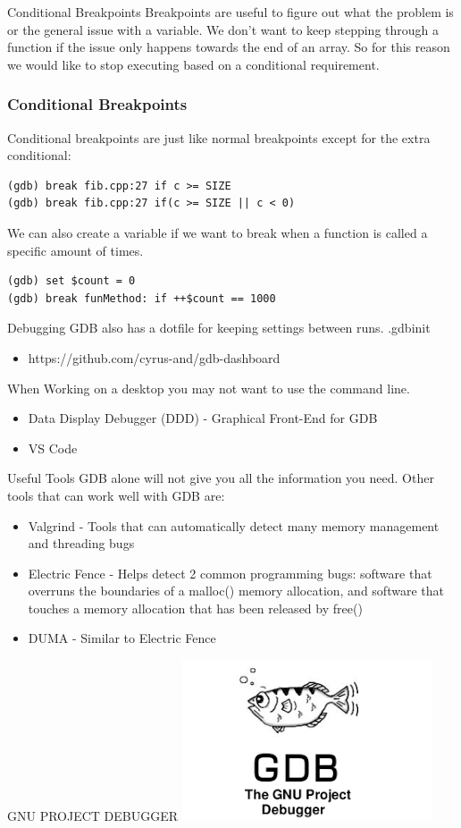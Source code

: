 \documentclass[11pt]{beamer}
\begin{document}
\begin{frame}{Conditional Breakpoints}
        Breakpoints are useful to figure out what the problem is or the general issue with a variable. 
        \break
        \break
        We don't want to keep stepping through a function if the issue only happens towards the end of an array. 
        \break
        \break
        So for this reason we would like to stop executing based on a conditional requirement.
\end{frame}

\begin{frame}[fragile]
\frametitle{Conditional Breakpoints}
Conditional breakpoints are just like normal breakpoints except for the extra conditional:
\begin{lstlisting}[style=BashInputStyle]
(gdb) break fib.cpp:27 if c >= SIZE
(gdb) break fib.cpp:27 if(c >= SIZE || c < 0)
\end{lstlisting}
We can also create a variable if we want to break when a function is called a specific amount of times.
\begin{lstlisting}[style=BashInputStyle]
(gdb) set $count = 0
(gdb) break funMethod: if ++$count == 1000
\end{lstlisting}
\end{frame}


\begin{frame}{Debugging}
GDB also has a dotfile for keeping settings between runs. .gdbinit
\begin{itemize}
\item https://github.com/cyrus-and/gdb-dashboard
\end{itemize}
When Working on a desktop you may not want to use the command line.
\begin{itemize}
\item Data Display Debugger (DDD) - Graphical Front-End for GDB
\item VS Code
\end{itemize}
\end{frame}

\begin{frame}{Useful Tools}
GDB alone will not give you all the information you need. Other tools that can work well with GDB are:
\begin{itemize}
\item Valgrind - Tools that can automatically detect many memory management and threading bugs
\item Electric Fence - Helps detect 2 common programming bugs: software that overruns the boundaries of a malloc() memory allocation, and software that touches a memory allocation that has been released by free()
\item DUMA - Similar to Electric Fence
\end{itemize}
\end{frame}

\begin{frame}{GNU PROJECT DEBUGGER}
\includegraphics{src/gdb_logo.png}
\end{frame}
\end{document}
